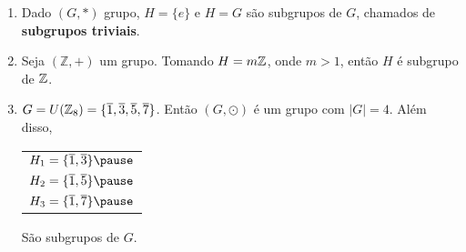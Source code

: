 \documentclass{beamer}
\begin{document}
    \begin{frame}
        \begin{exemplos}
            \begin{enumerate}[label={\arabic*})]
                \item Dado $(G,*)$ grupo, \pause $H=\{e\}$ \pause e $H=G$ \pause s{\~a}o subgrupos de $G$, \pause chamados de \textbf{subgrupos triviais}.\pause
                \item Seja $(\mathbb{Z},+)$ um grupo. \pause Tomando $H = m\mathbb{Z}$, \pause onde $m > 1$, ent{\~a}o $H$ {\'e} subgrupo de $\mathbb{Z}$.\pause
                \item $G = U(\mathbb{Z}_8) = \{\overline{1}, \overline{3}, \overline{5}, \overline{7}\}$. \pause Ent\~ao $(G,\odot)$ {\'e} um grupo \pause com $|G| = 4$. \pause Al\'em disso,\pause
                \begin{center}
                    \begin{tabular}{l}
                        $H_1 = \{\overline{1}, \overline{3}\}\pause$\\
                        $H_2 = \{\overline{1}, \overline{5}\}\pause$\\
                        $H_3 = \{\overline{1}, \overline{7}\}\pause$
                    \end{tabular}
                \end{center}
                S\~ao subgrupos de $G$.
            \end{enumerate}
        \end{exemplos}
    \end{frame}
\end{document}
